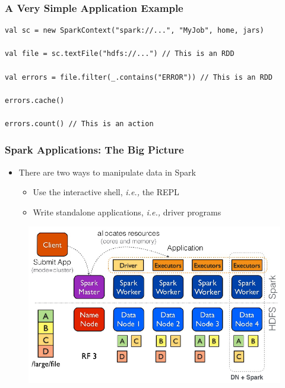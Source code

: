 \begin{frame}[fragile]
\frametitle{A Very Simple Application Example}


\begin{lstlisting}
val sc = new SparkContext("spark://...", "MyJob", home, jars) 

val file = sc.textFile("hdfs://...") // This is an RDD

val errors = file.filter(_.contains("ERROR")) // This is an RDD

errors.cache()

errors.count() // This is an action
\end{lstlisting}

\end{frame}

\begin{frame}
\frametitle{Spark Applications: The Big Picture}
\begin{itemize}
	\item There are two ways to manipulate data in Spark
	\begin{itemize}
		\item Use the interactive shell, \textit{i.e.,} the REPL
		\item Write standalone applications, \textit{i.e.,} driver programs
	\end{itemize}
\end{itemize}

	\begin{figure}[h]
	  \centering
	  \includegraphics[scale=0.33]{./Figures/spark_app_overview}
	  \label{fig:spark_app_overview}
	\end{figure}
\end{frame}

